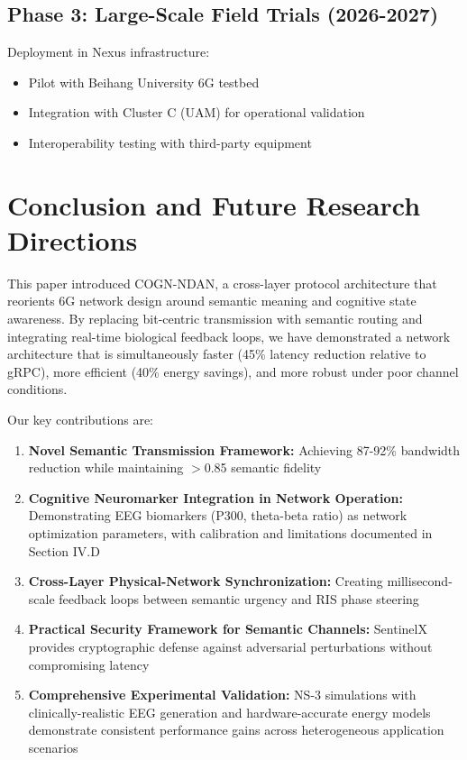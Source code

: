 \documentclass{BVP_CINC}
\newcommand{\COGN}{COGN-NDAN}
\begin{document}
\subsection{Phase 3: Large-Scale Field Trials (2026-2027)}
Deployment in Nexus infrastructure:
\begin{itemize}
    \item Pilot with Beihang University 6G testbed
    \item Integration with Cluster C (UAM) for operational validation
    \item Interoperability testing with third-party equipment
\end{itemize}

\section{Conclusion and Future Research Directions}

This paper introduced \COGN{}, a cross-layer protocol architecture that reorients 6G network design around semantic meaning and cognitive state awareness. By replacing bit-centric transmission with semantic routing and integrating real-time biological feedback loops, we have demonstrated a network architecture that is simultaneously faster (45\% latency reduction relative to gRPC), more efficient (40\% energy savings), and more robust under poor channel conditions.

Our key contributions are:
\begin{enumerate}
    \item \textbf{Novel Semantic Transmission Framework:} Achieving 87-92\% bandwidth reduction while maintaining $>$0.85 semantic fidelity
    \item \textbf{Cognitive Neuromarker Integration in Network Operation:} Demonstrating EEG biomarkers (P300, theta-beta ratio) as network optimization parameters, with calibration and limitations documented in Section IV.D
    \item \textbf{Cross-Layer Physical-Network Synchronization:} Creating millisecond-scale feedback loops between semantic urgency and RIS phase steering
    \item \textbf{Practical Security Framework for Semantic Channels:} SentinelX provides cryptographic defense against adversarial perturbations without compromising latency
    \item \textbf{Comprehensive Experimental Validation:} NS-3 simulations with clinically-realistic EEG generation and hardware-accurate energy models demonstrate consistent performance gains across heterogeneous application scenarios
\end{enumerate}
\end{document}
